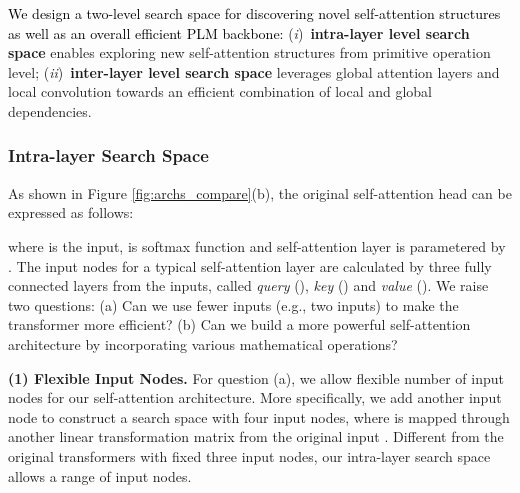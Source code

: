 \documentclass[letterpaper]{article} \usepackage{aaai22}  \usepackage{times}  \usepackage{helvet}  \usepackage{courier}  \usepackage[hyphens]{url}  \usepackage{graphicx} \urlstyle{rm} \def\UrlFont{\rm}  \usepackage{natbib}  \usepackage{caption} \DeclareCaptionStyle{ruled}{labelfont=normalfont,labelsep=colon,strut=off} \frenchspacing  \setlength{\pdfpagewidth}{8.5in}  \setlength{\pdfpageheight}{11in}  \usepackage{algorithm}
\newcommand{\Ni}{({\em i})~}
\newcommand{\Nii}{({\em ii})~}
\newcommand{\prj}[1]{\textcolor{black}{#1}} \newcommand{\prjj}[1]{\textcolor{black}{#1}} \newcommand{\jhh}[1]{\textcolor{black}{#1}} \newcommand{\jh}[1]{\textcolor{black}{#1}} \newcommand{\sh}[1]{\textcolor{black}{#1}} \usepackage{multirow}
\begin{document}
\prj{We design a two-level search space for discovering novel self-attention structures as well as an overall efficient PLM backbone:}
\Ni \textbf{intra-layer level search space} enables exploring new self-attention structures from primitive operation level; 
\Nii \textbf{inter-layer level search space} leverages global attention layers and local convolution towards an efficient combination of local and global dependencies.



\subsubsection{Intra-layer Search Space}

As shown in Figure \ref{fig:archs_compare}(b), the original self-attention head can be expressed as follows:
\vspace{-1mm}
\begin{small}

\label{equ:self-att}
\end{small}
\hspace{-1.5mm}where  is the input,  is softmax
function and self-attention layer is parametered by .
The input nodes for a
typical self-attention layer are calculated by three fully connected layers from the inputs, called \textit{query} (), \textit{key} () and \textit{value} ().
We raise two questions: (a) Can we use fewer inputs (e.g., two inputs) to make the transformer more efficient? (b) Can we build a more powerful self-attention architecture by incorporating various mathematical operations?




\textbf{(1) Flexible Input Nodes.}
For question (a), we allow flexible number of
input nodes for our self-attention architecture. More specifically,
we add another input node  to construct a search space with four
input nodes, where  is mapped through another linear transformation
matrix from the original input . Different from the original transformers
with fixed three input nodes, our intra-layer search space allows a
range of  input nodes.
\end{document}
